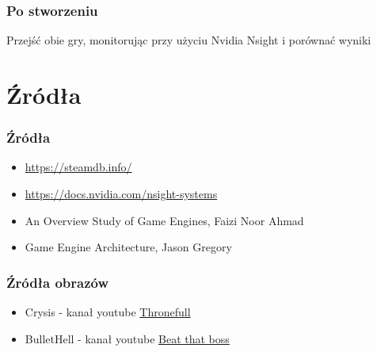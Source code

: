 \documentclass{beamer}
\begin{document}
      \begin{frame} 
        \frametitle{Po stworzeniu}
        Przejść obie gry, monitorując przy użyciu Nvidia Nsight i porównać wyniki
      \end{frame}


    \section{Źródła}
\begin{frame}
  \frametitle{Źródła}
    \begin{itemize}
        \item \href{https://steamdb.info/}{https://steamdb.info/}
    \item \href{https://docs.nvidia.com/nsight-systems}{https://docs.nvidia.com/nsight-systems}
    \item An Overview Study of Game Engines, Faizi Noor Ahmad 
    \item Game Engine Architecture, Jason Gregory
    \end{itemize}
    \end{frame}

    \begin{frame}
      \frametitle{Źródła obrazów}
        \begin{itemize}
          \item Crysis - kanał youtube \href{https://www.youtube.com/watch?v=vGjOALIrL_U}{Thronefull}
          \item BulletHell - kanał youtube \href{https://www.youtube.com/watch?app=desktop&v=h-wr6LoETA0}{Beat that boss}
        \end{itemize}
    \end{frame}
\end{document}
